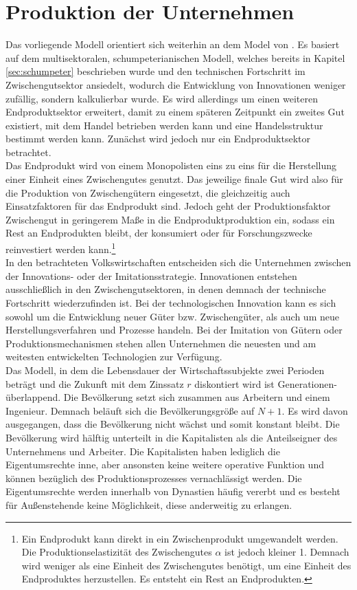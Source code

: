 \section{Produktion der Unternehmen}\label{sec:Produktion}
Das vorliegende Modell orientiert sich weiterhin an dem Model von \cite{Acemoglu.2006}. Es basiert auf dem multisektoralen, schumpeterianischen Modell, welches bereits in Kapitel \ref{sec:schumpeter} beschrieben wurde und den technischen Fortschritt im Zwischengutsektor ansiedelt, wodurch die Entwicklung von Innovationen weniger zufällig, sondern kalkulierbar wurde. Es wird allerdings um einen weiteren Endproduktsektor erweitert, damit zu einem späteren Zeitpunkt ein zweites Gut existiert, mit dem Handel betrieben werden kann und eine Handelsstruktur bestimmt werden kann. Zunächst wird jedoch nur ein Endproduktsektor betrachtet.\\
%
Das Endprodukt wird von einem Monopolisten eins zu eins für die Herstellung einer Einheit eines Zwischengutes genutzt. Das jeweilige finale Gut wird also für die Produktion von Zwischengütern eingesetzt, die gleichzeitig auch Einsatzfaktoren für das Endprodukt sind. Jedoch geht der Produktionsfaktor Zwischengut in geringerem Maße in die Endproduktproduktion ein, sodass ein Rest an Endprodukten bleibt, der konsumiert oder für Forschungszwecke reinvestiert werden kann.\footnote{Ein Endprodukt kann direkt in ein Zwischenprodukt umgewandelt werden. Die Produktionselastizität des Zwischengutes $\alpha$ ist jedoch kleiner 1. Demnach wird weniger als eine Einheit des Zwischengutes benötigt, um eine Einheit des Endproduktes herzustellen. Es entsteht ein Rest an Endprodukten.}\\
%
In den betrachteten Volkswirtschaften entscheiden sich die Unternehmen zwischen der Innovations- oder der Imitationsstrategie. Innovationen entstehen ausschließlich in den Zwischengutsektoren, in denen demnach der technische Fortschritt wiederzufinden ist. Bei der technologischen Innovation kann es sich sowohl um die Entwicklung neuer Güter bzw. Zwischengüter, als auch um neue Herstellungsverfahren und Prozesse handeln. Bei der Imitation von Gütern oder Produktionsmechanismen stehen allen Unternehmen die neuesten und am weitesten entwickelten Technologien zur Verfügung.\\
%
Das Modell, in dem die Lebensdauer der Wirtschaftssubjekte zwei Perioden beträgt und die Zukunft mit dem Zinssatz $r$ diskontiert wird ist Generationen-überlappend. Die Bevölkerung setzt sich zusammen aus Arbeitern und einem Ingenieur. Demnach beläuft sich die Bevölkerungsgröße auf $N+1$. Es wird davon ausgegangen, dass die Bevölkerung  nicht wächst und somit konstant bleibt. Die Bevölkerung wird hälftig unterteilt in die Kapitalisten als die Anteilseigner des Unternehmens und Arbeiter. Die Kapitalisten haben lediglich die Eigentumsrechte inne, aber ansonsten keine weitere operative Funktion und können bezüglich des Produktionsprozesses vernachlässigt werden. Die Eigentumsrechte werden innerhalb von Dynastien häufig vererbt und es besteht für Außenstehende keine Möglichkeit, diese anderweitig zu erlangen.\\
